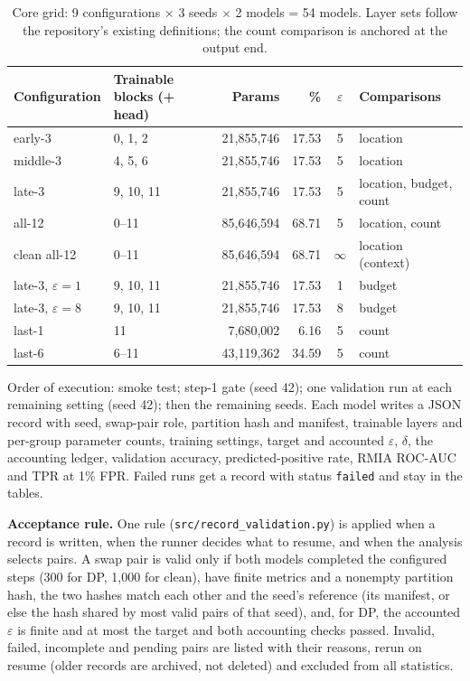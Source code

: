 \documentclass[11pt,a4paper]{article}
\begin{document}
\begin{table}[htbp]
\centering
\small
\caption{Core grid: 9 configurations $\times$ 3 seeds $\times$ 2 models = 54 models. Layer sets follow the repository's existing definitions; the count comparison is anchored at the output end.}
\label{tab:grid}
\setlength{\tabcolsep}{5pt}
\begin{tabular}{@{}llrrcl@{}}
\toprule
\textbf{Configuration} & \textbf{Trainable blocks (+ head)} & \textbf{Params} & \textbf{\%} & \textbf{$\varepsilon$} & \textbf{Comparisons} \\
\midrule
early-3 & 0, 1, 2 & 21{,}855{,}746 & 17.53 & 5 & location \\
middle-3 & 4, 5, 6 & 21{,}855{,}746 & 17.53 & 5 & location \\
late-3 & 9, 10, 11 & 21{,}855{,}746 & 17.53 & 5 & location, budget, count \\
all-12 & 0--11 & 85{,}646{,}594 & 68.71 & 5 & location, count \\
clean all-12 & 0--11 & 85{,}646{,}594 & 68.71 & $\infty$ & location (context) \\
late-3, $\varepsilon{=}1$ & 9, 10, 11 & 21{,}855{,}746 & 17.53 & 1 & budget \\
late-3, $\varepsilon{=}8$ & 9, 10, 11 & 21{,}855{,}746 & 17.53 & 8 & budget \\
last-1 & 11 & 7{,}680{,}002 & 6.16 & 5 & count \\
last-6 & 6--11 & 43{,}119{,}362 & 34.59 & 5 & count \\
\bottomrule
\end{tabular}
\end{table}

Order of execution: smoke test; step-1 gate (seed 42); one validation run at each remaining setting
(seed 42); then the remaining seeds. Each model writes a JSON record with seed, swap-pair role, partition
hash and manifest, trainable layers and per-group parameter counts, training settings, target and accounted
$\varepsilon$, $\delta$, the accounting ledger, validation accuracy, predicted-positive rate, RMIA ROC-AUC and
TPR at 1\% FPR. Failed runs get a record with status \texttt{failed} and stay in the tables.

\textbf{Acceptance rule.} One rule (\texttt{src/record\_validation.py}) is applied when a record is written,
when the runner decides what to resume, and when the analysis selects pairs. A swap pair is valid only if
both models completed the configured steps (300 for DP, 1{,}000 for clean), have finite metrics and a
nonempty partition hash, the two hashes match each other and the seed's reference (its manifest, or else the
hash shared by most valid pairs of that seed), and, for DP, the accounted $\varepsilon$ is finite and at most
the target and both accounting checks passed. Invalid, failed, incomplete and pending pairs are listed with
their reasons, rerun on resume (older records are archived, not deleted) and excluded from all statistics.
\end{document}
